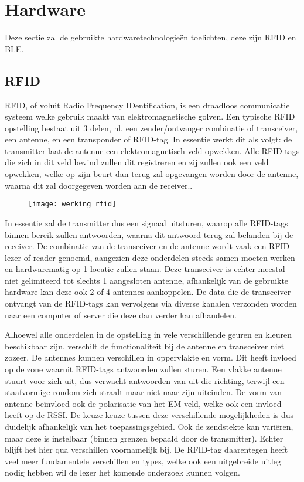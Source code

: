 \section{Hardware}
\label{sec:Hardware}
Deze sectie zal de gebruikte hardwaretechnologieën toelichten, deze zijn RFID en BLE.

\subsection{RFID}
\label{sec:RFID}
RFID, of voluit Radio Frequency IDentification, is een draadloos communicatie systeem welke gebruik maakt van elektromagnetische golven. Een typische RFID opstelling bestaat uit 3 delen, nl. een zender/ontvanger combinatie of transceiver, een antenne, en een transponder of RFID-tag.\autocite{Auxcis2022} In essentie werkt dit als volgt: de transmitter laat de antenne een elektromagnetisch veld opwekken. Alle RFID-tags die zich in dit veld bevind zullen dit registreren en zij zullen ook een veld opwekken, welke op zijn beurt dan terug zal opgevangen worden door de antenne, waarna dit zal doorgegeven worden aan de receiver.. 
\begin{figure}[h]
\texttt{[image: werking\_rfid]}
\centering
\end{figure}
In essentie zal de transmitter dus een signaal uitsturen, waarop alle RFID-tags binnen bereik zullen antwoorden, waarna dit antwoord terug zal belanden bij de receiver. De combinatie van de transceiver en de antenne wordt vaak een RFID lezer of reader genoemd, aangezien deze onderdelen steeds samen moeten werken en hardwarematig op 1 locatie zullen staan.\autocite{Amster2021}
Deze transceiver is echter meestal niet gelimiteerd tot slechts 1 aangesloten antenne, afhankelijk van de gebruikte hardware kan deze ook 2 of 4 antennes aankoppelen. De data die de transceiver ontvangt van de RFID-tags kan vervolgens via diverse kanalen verzonden worden naar een computer of server die deze dan verder kan afhandelen.

Alhoewel alle onderdelen in de opstelling in vele verschillende geuren en kleuren beschikbaar zijn, verschilt de functionaliteit bij de antenne en transceiver niet zozeer. De antennes kunnen verschillen in oppervlakte en vorm. Dit heeft invloed op de zone waaruit RFID-tags antwoorden zullen sturen. Een vlakke antenne stuurt voor zich uit, dus verwacht antwoorden van uit die richting, terwijl een staafvormige rondom zich straalt maar niet naar zijn uiteinden. De vorm van antenne beïnvloed ook de polarisatie van het EM veld, welke ook een invloed heeft op de RSSI. De keuze keuze tussen deze verschillende mogelijkheden is dus duidelijk afhankelijk van het toepassingsgebied. Ook de zendstekte kan variëren, maar deze is instelbaar (binnen grenzen bepaald door de transmitter). Echter blijft het hier qua verschillen voornamelijk bij. De RFID-tag daarentegen heeft veel meer fundamentele verschillen en types, welke ook een uitgebreide uitleg nodig hebben wil de lezer het komende onderzoek kunnen volgen.

